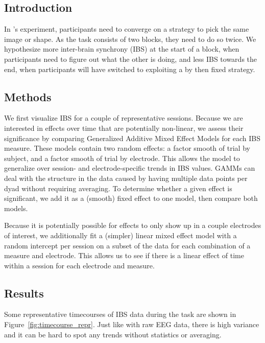 \subsection{Introduction}

In \textcite{newman_effects_2021}'s experiment, participants need to converge on
a strategy to pick the same image or shape. As the task consists of two blocks, they
need to do so twice. We hypothesize more inter-brain synchrony (IBS) at the start of
a block, when participants need to figure out what the other is doing, and less
IBS towards the end, when participants will have switched to exploiting a by
then fixed strategy.

\subsection{Methods}

We first visualize IBS for a couple of representative sessions. Because we are
interested in effects over time that are potentially non-linear, we assess
their significance by comparing Generalized Additive Mixed Effect Models
\parencite[][GAMMs]{wood_generalized_2006} for each IBS measure. These models
contain two random effects: a factor smooth of trial by subject, and a factor
smooth of trial by electrode. This allows the model to generalize over session-
and electrode-specific trends in IBS values. GAMMs can deal with the structure
in the data caused by having multiple data points per dyad without requiring
averaging. To determine whether a given effect is significant, we add it as a
(smooth) fixed effect to one model, then compare both models.

Because it is potentially possible for effects to only show up in a couple
electrodes of interest, we additionally fit a (simpler) linear mixed effect
model with a random intercept per session on a subset of the data for each
combination of a measure and electrode. This allows us to see if there is a
linear effect of time within a session for each electrode and measure.

\subsection{Results}

Some representative timecourses of IBS data during the task are shown in
Figure~\ref{fig:timecourse_repr}. Just like with raw EEG data, there is high
variance and it can be hard to spot any trends without statistics or averaging.

